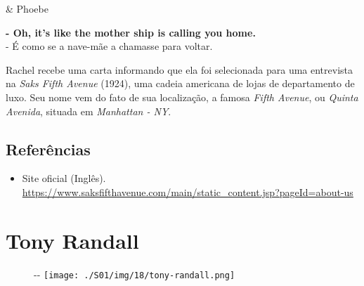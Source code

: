 \begin{tcolorbox}[enhanced,center upper,
    drop fuzzy shadow southeast, boxrule=0.3pt,
    lower separated=false, breakable,
    colframe=black!30!dialogoBorder,colback=white]
\medskip
\begin{minipage}[c]{0.16\linewidth}
   & \centering \scriptsize{Phoebe}
\end{minipage}
\hfill
\begin{minipage}[c]{0.8\linewidth}
  \textbf{- Oh, it's like the mother ship is calling you home.}\\
  - É como se a nave-mãe a chamasse para voltar.
\end{minipage}
\end{tcolorbox}

Rachel recebe uma carta informando que ela foi selecionada para uma
entrevista na \emph{Saks Fifth Avenue} (1924), uma cadeia americana de
lojas de departamento de luxo. Seu nome vem do fato de sua localização,
a famosa \emph{Fifth Avenue}, ou \emph{Quinta Avenida}, situada em
\emph{Manhattan - NY}.

\hypertarget{referuxeancias-10}{%
\subsection{Referências}\label{referuxeancias-10}}

\begin{itemize}
\tightlist
\item
  \sloppy Site oficial (Inglês). \url{https://www.saksfifthavenue.com/main/static_content.jsp?pageId=about-us}
\end{itemize}

\hypertarget{tony-randall}{%
\section{Tony Randall}\label{tony-randall}}

\begin{figure}[!ht]
  \begin{adjustwidth}{-\oddsidemargin-1in}{-\rightmargin}
    \centering
    \texttt{[image: ./S01/img/18/tony-randall.png]}
  \end{adjustwidth}
\end{figure}

